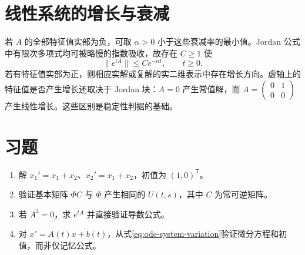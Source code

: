 \section{线性系统的增长与衰减}
若 $A$ 的全部特征值实部为负，可取 $\alpha>0$ 小于这些衰减率的最小值。Jordan 公式中有限次多项式均可被略慢的指数吸收，故存在 $C\geq1$ 使
\[
 \|e^{tA}\|\leq Ce^{-\alpha t},\qquad t\geq0.
\]
若有特征值实部为正，则相应实解或复解的实二维表示中存在增长方向。虚轴上的特征值是否产生增长还取决于 Jordan 块：$A=0$ 产生常值解，而 $A=\begin{pmatrix}0&1\\0&0\end{pmatrix}$ 产生线性增长。这些区别是稳定性判据的基础。

\section{习题}
\begin{enumerate}
 \item\label{ex:ode-system} 解 $x_1'=x_1+x_2$、$x_2'=x_1+x_2$，初值为 $(1,0)^{\mathsf T}$。
 \item 验证基本矩阵 $\Phi C$ 与 $\Phi$ 产生相同的 $U(t,s)$，其中 $C$ 为常可逆矩阵。
 \item\label{ex:ode-nilpotent} 若 $A^3=0$，求 $e^{tA}$ 并直接验证导数公式。
 \item 对 $x'=A(t)x+b(t)$，从式\eqref{eq:ode-system-variation}验证微分方程和初值，而非仅记忆公式。
\end{enumerate}


